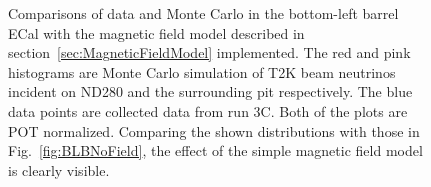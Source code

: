 \begin{figure}[bottom]%
  \centering
  \hspace{1em}
  \caption{Comparisons of data and Monte Carlo in the bottom-left barrel ECal with the magnetic field model described in section~\ref{sec:MagneticFieldModel} implemented.  The red and pink histograms are Monte Carlo simulation of T2K beam neutrinos incident on ND280 and the surrounding pit respectively.  The blue data points are collected data from run 3C.  Both of the plots are POT normalized.  Comparing the shown distributions with those in Fig.~\ref{fig:BLBNoField}, the effect of the simple magnetic field model is clearly visible.}
  \label{fig:BLBWithField}
\end{figure}
